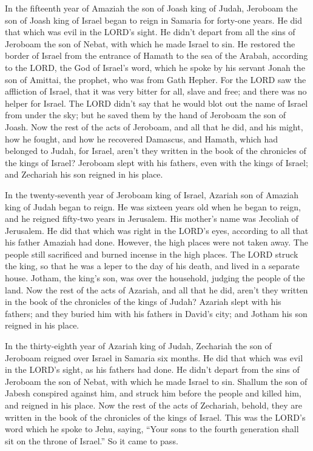 \myverse{}In the fifteenth year of Amaziah the son of Joash king of Judah,
Jeroboam the son of Joash king of Israel began to reign in Samaria for forty-one years.
\myverse{}He did that which was evil in the LORD’s sight. He didn’t depart from all
the sins of Jeroboam the son of Nebat, with which he made Israel to sin.
\myverse{}He restored the border of Israel from the entrance of Hamath to the sea of
the Arabah, according to the LORD, the God of Israel’s word, which he spoke by his servant Jonah the son
of Amittai, the prophet, who was from Gath Hepher.
\myverse{}For the LORD saw the affliction of Israel, that it was very bitter for all,
slave and free; and there was no helper for Israel.
\myverse{}The LORD didn’t say that he would blot out the name of Israel from under
the sky; but he saved them by the hand of Jeroboam the son of Joash.
\myverse{}Now the rest of the acts of Jeroboam, and all that he did, and his might,
how he fought, and how he recovered Damascus, and Hamath, which had belonged to Judah, for Israel, aren’t
they written in the book of the chronicles of the kings of Israel?
\myverse{}Jeroboam slept with his fathers, even with the kings of Israel; and Zechariah
his son reigned in his place.


\mychapter{} \myverse*{}In the twenty-seventh year of Jeroboam king of Israel, Azariah
son of Amaziah king of Judah began to reign.
\myverse{}He was sixteen years old when he began to reign, and he reigned fifty-two years
in Jerusalem. His mother’s name was Jecoliah of Jerusalem.
\myverse{}He did that which was right in the LORD’s eyes, according to all that his father
Amaziah had done.
\myverse{}However, the high places were not taken away. The people still sacrificed and
burned incense in the high places.
\myverse{}The LORD struck the king, so that he was a leper to the day of his death, and
lived in a separate house. Jotham, the king’s son, was over the household, judging the people of the land.
\myverse{}Now the rest of the acts of Azariah, and all that he did, aren’t they written
in the book of the chronicles of the kings of Judah?
\myverse{}Azariah slept with his fathers; and they buried him with his fathers in David’s
city; and Jotham his son reigned in his place.

\myverse{}In the thirty-eighth year of Azariah king of Judah, Zechariah
the son of Jeroboam reigned over Israel in Samaria six months.
\myverse{}He did that which was evil in the LORD’s sight, as his fathers had done. He
didn’t depart from the sins of Jeroboam the son of Nebat, with which he made Israel to sin.
\myverse{}Shallum the son of Jabesh conspired against him, and struck him before the
people and killed him, and reigned in his place.
\myverse{}Now the rest of the acts of Zechariah, behold, they are written in the book
of the chronicles of the kings of Israel.
\myverse{}This was the LORD’s word which he spoke to Jehu, saying, “Your sons to the
fourth generation shall sit on the throne of Israel.” So it came to pass.

